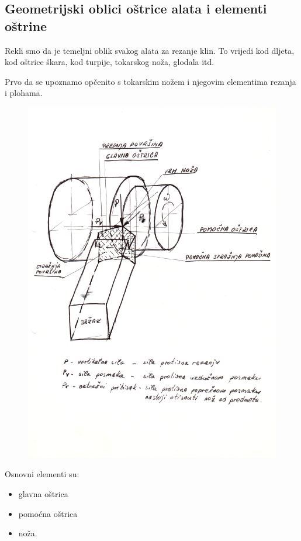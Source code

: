 \documentclass[a4paper,12pt]{article}
\numberwithin{figure}{section}
\begin{document}
\subsection{Geometrijski oblici oštrice alata i elementi oštrine}
Rekli smo da je temeljni oblik svakog alata za rezanje klin. To vrijedi kod dljeta, kod oštrice škara, kod turpije, tokarskog noža, glodala itd. \par
Prvo da se upoznamo opčenito s tokarskim nožem i njegovim elementima rezanja i plohama.
\begin{figure}[!h]
\centering
\includegraphics[width=\textwidth]{image_01.png}
\end{figure}
\FloatBarrier
\noindent Osnovni elementi su:
\begin{itemize}
\item glavna oštrica
\item pomoćna oštrica
\item noža.
\end{itemize}
\end{document}
